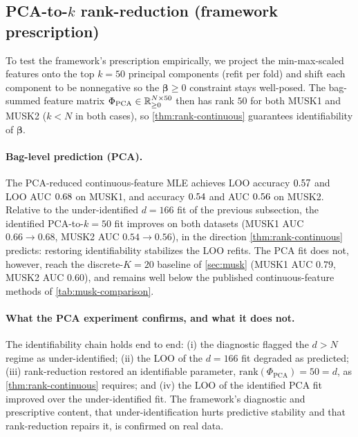 \subsection{PCA-to-$k$ rank-reduction (framework prescription)}
\label{sec:musk-pca}

To test the framework's prescription empirically, we project the
min-max-scaled features onto the top $k = 50$ principal components
(refit per fold) and shift each component to be nonnegative so the
$\bm\beta \geq 0$ constraint stays well-posed. The bag-summed
feature matrix $\Phi_{\mathrm{PCA}} \in \mathbb{R}^{N \times 50}_{\geq 0}$
then has rank $50$ for both MUSK1 and MUSK2 ($k < N$ in both
cases), so \cref{thm:rank-continuous} guarantees identifiability of
$\bm\beta$.

\paragraph{Bag-level prediction (PCA).} The PCA-reduced
continuous-feature MLE achieves LOO accuracy $0.57{}$ and
LOO AUC $0.68{}$ on MUSK1, and accuracy
$0.54{}$ and AUC $0.56{}$ on MUSK2. Relative to
the under-identified $d = 166$ fit of the previous subsection, the
identified PCA-to-$k = 50$ fit improves on both datasets (MUSK1 AUC
$0.66 \to 0.68$, MUSK2 AUC $0.54 \to 0.56$), in the direction
\cref{thm:rank-continuous} predicts: restoring identifiability
stabilizes the LOO refits. The PCA fit does not, however, reach the
discrete-$K = 20$ baseline of \cref{sec:musk} (MUSK1 AUC $0.79$,
MUSK2 AUC $0.60$), and remains well below the published
continuous-feature methods of \cref{tab:musk-comparison}.

\paragraph{What the PCA experiment confirms, and what it does not.}
The identifiability chain holds end to end: (i) the diagnostic
flagged the $d > N$ regime as under-identified; (ii) the LOO of the
$d = 166$ fit degraded as predicted; (iii) rank-reduction restored
an identifiable parameter, $\mathrm{rank}(\Phi_{\mathrm{PCA}}) = 50
= d$, as \cref{thm:rank-continuous} requires; and (iv) the LOO of
the identified PCA fit improved over the under-identified fit. The
framework's diagnostic and prescriptive content, that
under-identification hurts predictive stability and that
rank-reduction repairs it, is confirmed on real data.

